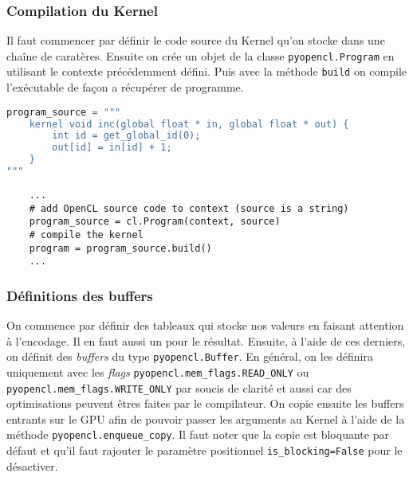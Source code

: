 \subsubsection{Compilation du Kernel}

Il faut commencer par définir le code source du Kernel qu'on stocke dans une 
chaîne de caratères. Ensuite on crée un objet de la classe 
\texttt{pyopencl.Program} en utilisant le contexte précédemment défini. Puis 
avec la méthode \texttt{build} on compile l'exécutable de façon a récupérer 
de programme. 
\newline
\newline
{}
\begin{lstlisting}[language=python]
program_source = """
    kernel void inc(global float * in, global float * out) {
        int id = get_global_id(0);
        out[id] = in[id] + 1;
    }
"""
\end{lstlisting}
\vspace{10pt}

\begin{lstlisting}
    ...
    # add OpenCL source code to context (source is a string)
    program_source = cl.Program(context, source)
    # compile the kernel
    program = program_source.build()
    ...
\end{lstlisting}

\subsubsection{Définitions des buffers}

On commence par définir des tableaux qui stocke nos valeurs en faisant 
attention à l'encodage. Il en faut aussi un pour le résultat.
Ensuite, à l'aide de ces derniers, on définit des \textit{buffers} du type 
\texttt{pyopencl.Buffer}. En général, on les définira uniquement avec 
les \textit{flags} \texttt{pyopencl.mem\_flags.READ\_ONLY} ou 
\texttt{pyopencl.mem\_flags.WRITE\_ONLY} par soucis de clarité et aussi car des 
optimisations peuvent êtres faites par le compilateur.
On copie ensuite les buffers entrants sur le GPU afin de pouvoir passer les 
arguments au Kernel à l'aide de la méthode \texttt{pyopencl.enqueue\_copy}. 
Il faut noter que la copie est bloquante par défaut et qu'il faut rajouter le 
paramètre positionnel \texttt{is\_blocking=False} pour le désactiver.

